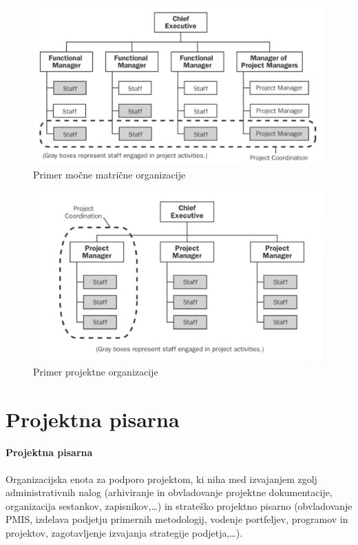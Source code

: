 \documentclass[a4paper,12pt]{report}
\begin{document}
         \begin{figure}[h]
            \includegraphics[scale=0.375]{009.png}
            \caption{Primer močne matrične organizacije}
         \end{figure}
         \begin{figure}[h]
            \includegraphics[scale=0.375]{008.png}
            \caption{Primer projektne organizacije}
         \end{figure}

   \section{Projektna pisarna}
         \paragraph{Projektna pisarna} Organizacijska enota za podporo projektom, ki niha med izvajanjem zgolj administrativnih nalog (arhiviranje in obvladovanje projektne dokumentacije, organizacija sestankov, zapisnikov,\dots) in strateško projektno pisarno (obvladovanje PMIS, izdelava podjetju primernih metodologij, vodenje portfeljev, programov in projektov, zagotavljenje izvajanja strategije podjetja,\dots).
\end{document}

